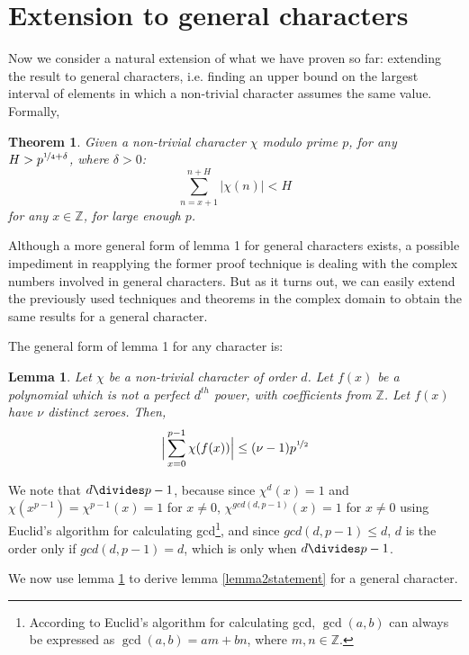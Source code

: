 \documentclass{report}
\newtheorem{lemma}{Lemma}
\newtheorem{theorem}{Theorem}
\begin{document}
\section{Extension to general characters}
%
%
Now we consider a natural extension of what we have proven so far: extending the result to general characters, i.e. finding an upper bound on the largest interval of elements in which a non-trivial character assumes the same value. Formally,
\begin{theorem} \label{thm:genp4bound}
Given a non-trivial character $\chi$ modulo prime $p$, for any $H>p^{\nicefrac{1}{4}+\delta}$, where $\delta>0$:
\[\sum\limits_{n=x+1}^{n+H}\lvert\chi(n)\rvert<H\]
for any $x\in\mathbb{Z}$, for large enough $p$.
\end{theorem}
Although a more general form of lemma 1 for general characters exists, a possible impediment in reapplying the former proof technique is dealing with the complex numbers involved in general characters. But as it turns out, we can easily extend the previously used techniques and theorems in the complex domain to obtain the same results for a general character.

The general form of lemma 1 for any character is:
\begin{lemma} \label{lemma4}
\textup{\cite{schmidt}}Let $\chi$ be a non-trivial character of order $d$. Let $f(x)$ be a polynomial which is not a perfect $d^{th}$ power, with coefficients from $\mathbb{Z}$. Let $f(x)$ have $\nu$ distinct zeroes. Then,
$$\Big\lvert\sum\limits_{x=0}^{p-1}\chi(f(x))\Big\rvert\leq (\nu -1)p^{\nicefrac{1}{2}}$$
\end{lemma}
We note that $d \divides p-1$, because since $\chi^{d}(x)=1$ and $\chi(x^{p-1})=\chi^{p-1}(x)=1$ for $x\neq0$, $\chi^{gcd(d,p-1)}(x)=1$ for $x\neq0$ using Euclid's algorithm for calculating gcd\footnote[2]{According to Euclid's algorithm for calculating gcd, $\gcd(a,b)$ can always be expressed as $\gcd(a,b)=am+bn$, where $m,n\in \mathbb{Z}$.}, and since $gcd(d,p-1)\leq d$, $d$ is the order only if $gcd(d,p-1) = d$, which is only when $d \divides p-1$.

We now use lemma \ref{lemma4} to derive lemma \ref{lemma2statement} for a general character.
\end{document}
